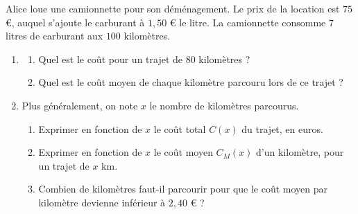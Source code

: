 \exo

Alice loue une camionnette pour son déménagement. Le prix de la location est $75$ \euro{}, auquel s'ajoute le carburant à $1,50$ \euro{} le litre. La camionnette consomme $7$ litres de carburant aux $100$ kilomètres.
\begin{enumerate}
\item
\begin{enumerate}
\item Quel est le coût pour un trajet de $80$ kilomètres ?
\item Quel est le coût moyen de chaque kilomètre parcouru lors de ce trajet ?
\end{enumerate}
\item Plus généralement, on note $x$ le nombre de kilomètres parcourus.
\begin{enumerate}
\item Exprimer en fonction de $x$ le coût total $C(x)$ du trajet, en euros.
\item Exprimer en fonction de $x$ le coût moyen $C_M(x)$ d'un kilomètre, pour un trajet de $x$ km.
\item Combien de kilomètres faut-il parcourir pour que le coût moyen par kilomètre devienne inférieur à $2,40$ \euro{} ?
\end{enumerate}
\end{enumerate}

